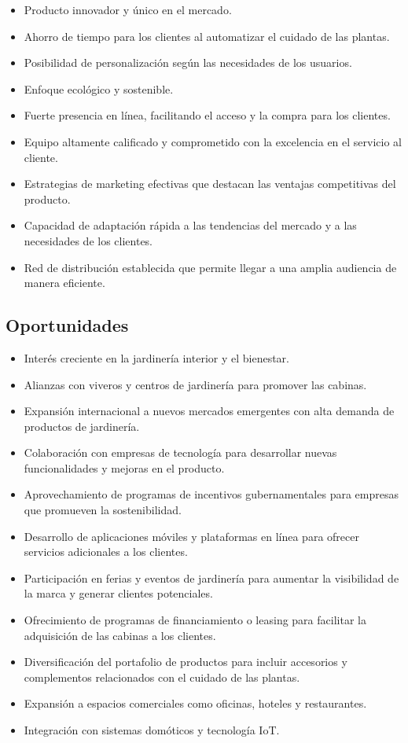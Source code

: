 \begin{itemize}
    \item Producto innovador y único en el mercado.
    \item Ahorro de tiempo para los clientes al automatizar el cuidado de las plantas.
    \item Posibilidad de personalización según las necesidades de los usuarios.
    \item Enfoque ecológico y sostenible.
    \item Fuerte presencia en línea, facilitando el acceso y la compra para los clientes.
    \item Equipo altamente calificado y comprometido con la excelencia en el servicio al cliente.
    \item Estrategias de marketing efectivas que destacan las ventajas competitivas del producto.
    \item Capacidad de adaptación rápida a las tendencias del mercado y a las necesidades de los clientes.
    \item Red de distribución establecida que permite llegar a una amplia audiencia de manera eficiente.

\end{itemize}

\subsection{Oportunidades}

\begin{itemize}
    \item Interés creciente en la jardinería interior y el bienestar.
    \item Alianzas con viveros y centros de jardinería para promover las cabinas.
    \item Expansión internacional a nuevos mercados emergentes con alta demanda de productos de jardinería.
    \item Colaboración con empresas de tecnología para desarrollar nuevas funcionalidades y mejoras en el producto.
    \item Aprovechamiento de programas de incentivos gubernamentales para empresas que promueven la sostenibilidad.
    \item Desarrollo de aplicaciones móviles y plataformas en línea para ofrecer servicios adicionales a los clientes.
    \item Participación en ferias y eventos de jardinería para aumentar la visibilidad de la marca y generar clientes potenciales.
    \item Ofrecimiento de programas de financiamiento o leasing para facilitar la adquisición de las cabinas a los clientes.
    \item Diversificación del portafolio de productos para incluir accesorios y complementos relacionados con el cuidado de las plantas.

    \item Expansión a espacios comerciales como oficinas, hoteles y restaurantes.
    \item Integración con sistemas domóticos y tecnología IoT.
    
\end{itemize}

